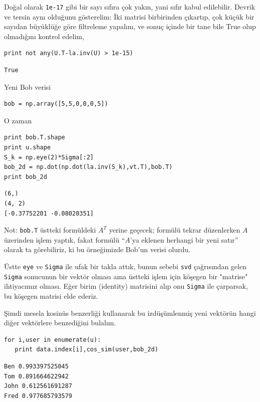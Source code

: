 \documentclass[12pt,fleqn]{article}\usepackage{../../common}
\begin{document}
Doğal olarak \verb!1e-17! gibi bir sayı sıfıra çok yakın, yani sıfır kabul
edilebilir. Devrik ve tersin aynı olduğunu gösterelim: İki matrisi birbirinden
çıkartıp, çok küçük bir sayıdan büyüklüğe göre filtreleme yapalım, ve sonuç
içinde bir tane bile True olup olmadığını kontrol edelim,

\begin{verbatim}
print not any(U.T-la.inv(U) > 1e-15)
\end{verbatim}

\begin{verbatim}
True
\end{verbatim}

Yeni Bob verisi 

\begin{verbatim}
bob = np.array([5,5,0,0,0,5]) 
\end{verbatim}

O zaman 

\begin{verbatim}
print bob.T.shape
print u.shape
S_k = np.eye(2)*Sigma[:2]
bob_2d = np.dot(np.dot(la.inv(S_k),vt.T),bob.T)
print bob_2d
\end{verbatim}

\begin{verbatim}
(6,)
(4, 2)
[-0.37752201 -0.08020351]
\end{verbatim}

Not: \verb!bob.T! üstteki formüldeki $A^T$ yerine geçecek; formülü tekrar
düzenlerken $A$ üzerinden işlem yaptık, fakat formülü ``$A$'ya eklenen
herhangi bir yeni satır'' olarak ta görebiliriz, ki bu örneğimizde Bob'un
verisi olurdu. 

Üstte \verb!eye! ve \verb!Sigma! ile ufak bir takla attık, bunun sebebi
\verb!svd! çağrısından gelen \verb!Sigma!  sonucunun bir vektör olması ama
üstteki işlem için köşegen bir "matrise" ihtiyacımız olması. Eğer birim
(identity) matrisini alıp onu \verb!Sigma! ile çarparsak, bu köşegen
matrisi elde ederiz.

Şimdi mesela kosinüs benzerliği kullanarak bu izdüşümlenmiş yeni
vektörün hangi diğer vektörlere benzediğini bulalım.

\begin{verbatim}
for i,user in enumerate(u):
   print data.index[i],cos_sim(user,bob_2d)
\end{verbatim}

\begin{verbatim}
Ben 0.993397525045
Tom 0.891664622942
John 0.612561691287
Fred 0.977685793579
\end{verbatim}
\end{document}
